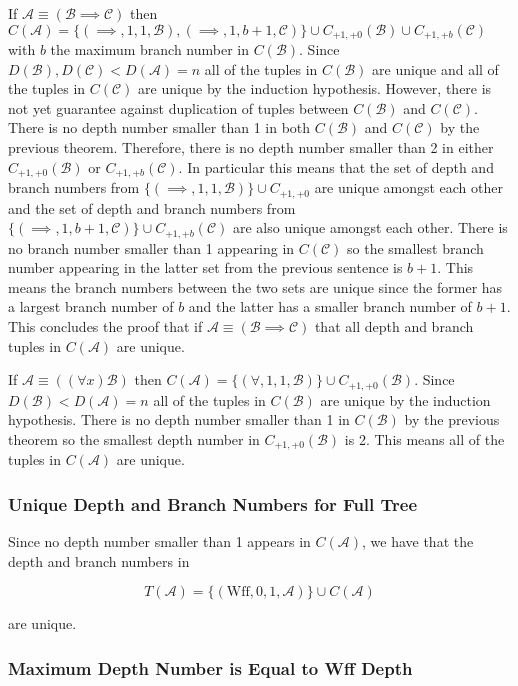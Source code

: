 \documentclass[12pt]{article}
\theoremstyle{break}
\theoremstyle{break}
\theoremstyle{break}
\theoremstyle{break}
\theoremstyle{break}
\newtheorem{informal definition}[definition]{Informal Definition}
\newcommand{\mc}[1]{\mathcal{#1}}
\begin{document}
If $\mc{A} \equiv (\mc{B} \implies \mc{C})$ then $C(\mc{A}) = \{(\implies, 1, 1, \mc{B}), (\implies, 1, b+1, \mc{C})\} \cup C_{+1, +0}(\mc{B}) \cup C_{+1, +b}(\mc{C})$ with $b$ the maximum branch number in $C(\mc{B})$. Since $D(\mc{B}), D(\mc{C}) < D(\mc{A}) = n$ all of the tuples in $C(\mc{B})$ are unique and all of the tuples in $C(\mc{C})$ are unique by the induction hypothesis. However, there is not yet guarantee against duplication of tuples between $C(\mc{B})$ and $C(\mc{C})$. There is no depth number smaller than 1 in both $C(\mc{B})$ and $C(\mc{C})$ by the previous theorem. Therefore, there is no depth number smaller than 2 in either $C_{+1, +0}(\mc{B})$ or $C_{+1, +b}(\mc{C})$. In particular this means that the set of depth and branch numbers from $\{(\implies, 1, 1, \mc{B})\} \cup C_{+1, +0}$ are unique amongst each other and the set of depth and branch numbers from $\{(\implies, 1, b+1, \mc{C})\} \cup C_{+1, +b}(\mc{C})$ are also unique amongst each other. There is no branch number smaller than 1 appearing in $C(\mc{C})$ so the smallest branch number appearing in the latter set from the previous sentence is $b+1$. This means the branch numbers between the two sets are unique since the former has a largest branch number of $b$ and the latter has a smaller branch number of $b+1$. This concludes the proof that if $\mc{A} \equiv (\mc{B} \implies \mc{C})$ that all depth and branch tuples in $C(\mc{A})$ are unique.

If $\mc{A} \equiv ((\forall x)\mc{B})$ then $C(\mc{A}) = \{(\forall, 1, 1, \mc{B})\} \cup C_{+1, +0}(\mc{B})$. Since $D(\mc{B}) < D(\mc{A}) = n$ all of the tuples in $C(\mc{B})$ are unique by the induction hypothesis. There is no depth number smaller than 1 in $C(\mc{B})$ by the previous theorem so the smallest depth number in $C_{+1, +0}(\mc{B})$ is 2. This means all of the tuples in $C(\mc{A})$ are unique.

\subsubsection{Unique Depth and Branch Numbers for Full Tree}

Since no depth number smaller than 1 appears in $C(\mc{A})$, we have that the depth and branch numbers in

$$
T(\mc{A}) = \{(\text{Wff}, 0, 1, \mc{A})\} \cup C(\mc{A})
$$

are unique.


\subsubsection{Maximum Depth Number is Equal to Wff Depth}
\end{document}
